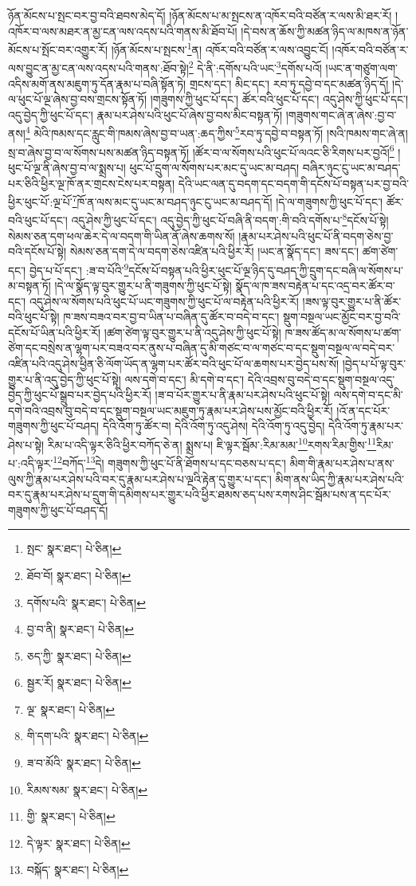 ཉོན་མོངས་པ་སྤང་བར་བྱ་བའི་ཐབས་མེད་དོ། །ཉོན་མོངས་པ་མ་སྤངས་ན་འཁོར་བའི་བཙོན་ར་ལས་མི་ཐར་རོ། །འཁོར་བ་ལས་མཐར་ན་མྱ་ངན་ལས་འདས་པའི་གནས་མི་ཐོབ་པོ། །དེ་བས་ན་ཆོས་ཀྱི་མཚན་ཉིད་ལ་མཁས་ན་ཉོན་མོངས་པ་སྤོང་བར་འགྱུར་རོ། །ཉོན་མོངས་པ་སྤངས་\footnote{སྤང་  སྣར་ཐང་།  པེ་ཅིན། }ན། འཁོར་བའི་བཙོན་ར་ལས་འབྱུང་ངོ། །འཁོར་བའི་བཙོན་ར་ལས་བྱུང་ན་མྱ་ངན་ལས་འདས་པའི་གནས་:ཐོབ་སྟེ།\footnote{ཐོབ་བོ།  སྣར་ཐང་།  པེ་ཅིན། } དེ་ནི་:དགོས་པའི་ཡང་\footnote{དགོས་པའི་  སྣར་ཐང་།  པེ་ཅིན། }དགོས་པའོ། །ཡང་ན་གཙུག་ལག་འདིས་མགོ་ནས་མཇུག་ཏུ་དོན་རྣམ་པ་བཞི་སྟོན་ཏེ། གྲངས་དང་། མིང་དང་། རབ་ཏུ་དབྱེ་བ་དང་མཚན་ཉིད་དོ། །དེ་ལ་ཕུང་པོ་ལྔ་ཞེས་བྱ་བས་གྲངས་སྟོན་ཏོ། །གཟུགས་ཀྱི་ཕུང་པོ་དང་། ཚོར་བའི་ཕུང་པོ་དང་། འདུ་ཤེས་ཀྱི་ཕུང་པོ་དང་། འདུ་བྱེད་ཀྱི་ཕུང་པོ་དང་། རྣམ་པར་ཤེས་པའི་ཕུང་པོ་ཞེས་བྱ་བས་མིང་བསྟན་ཏོ། །གཟུགས་གང་ཞེ་ན་ཞེས་:བྱ་བ་ནས།\footnote{བྱ་བ་ནི།  སྣར་ཐང་།  པེ་ཅིན། } མེའི་ཁམས་དང་རླུང་གི་ཁམས་ཞེས་བྱ་བ་ཡན་:ཆད་ཀྱིས་\footnote{ཅད་ཀྱི་  སྣར་ཐང་།  པེ་ཅིན། }རབ་ཏུ་དབྱེ་བ་བསྟན་ཏོ། །སའི་ཁམས་གང་ཞེ་ན། སྲ་བ་ཞེས་བྱ་བ་ལ་སོགས་པས་མཚན་ཉིད་བསྟན་ཏོ། །ཚོར་བ་ལ་སོགས་པའི་ཕུང་པོ་ལའང་ཅི་རིགས་པར་བྱའོ།\footnote{སྦྱར་རོ།  སྣར་ཐང་།  པེ་ཅིན། } །ཕུང་པོ་ལྔ་ནི་ཞེས་བྱ་བ་ལ་སྨྲས་པ། ཕུང་པོ་དྲུག་ལ་སོགས་པར་མང་དུ་ཡང་མ་བཤད། བཞིར་ཉུང་ངུ་ཡང་མ་བཤད་པར་ཅིའི་ཕྱིར་ལྔ་ཁོ་ནར་གྲངས་ངེས་པར་བསྟན། དེའི་ཡང་ལན་དུ་བདག་དང་བདག་གི་དངོས་པོ་བསྟན་པར་བྱ་བའི་ཕྱིར་ཕུང་པོ་:ལྔ་པོ་\footnote{ལྔ་  སྣར་ཐང་།  པེ་ཅིན། }ཁོ་ན་ལས་མང་དུ་ཡང་མ་བཤད་ཉུང་ངུ་ཡང་མ་བཤད་དོ། །དེ་ལ་གཟུགས་ཀྱི་ཕུང་པོ་དང་། ཚོར་བའི་ཕུང་པོ་དང་། འདུ་ཤེས་ཀྱི་ཕུང་པོ་དང་། འདུ་བྱེད་ཀྱི་ཕུང་པོ་བཞི་ནི་བདག་:གི་བའི་དགོས་པ་\footnote{གི་དག་པའི་  སྣར་ཐང་།  པེ་ཅིན། }དངོས་པོ་སྟེ། སེམས་ཅན་དག་ཕལ་ཆེར་དེ་ལ་བདག་གི་ཡིན་ནོ་ཞེས་ཆགས་སོ། །རྣམ་པར་ཤེས་པའི་ཕུང་པོ་ནི་བདག་ཅེས་བྱ་བའི་དངོས་པོ་སྟེ། སེམས་ཅན་དག་དེ་ལ་བདག་ཅེས་འཛིན་པའི་ཕྱིར་རོ། །ཡང་ན་སྣོད་དང་། ཟས་དང་། ཚག་ཙེག་དང་། བྱེད་པ་པོ་དང་། :ཟ་བ་པོའི་\footnote{ཟ་བ་མོའི་  སྣར་ཐང་།  པེ་ཅིན། }དངོས་པོ་བསྟན་པའི་ཕྱིར་ཕུང་པོ་ལྔ་ཉིད་དུ་བཤད་ཀྱི་དྲུག་དང་བཞི་ལ་སོགས་པ་མ་བསྟན་ཏོ། །དེ་ལ་སྣོད་ལྟ་བུར་གྱུར་པ་ནི་གཟུགས་ཀྱི་ཕུང་པོ་སྟེ། སྣོད་ལ་ཁ་ཟས་བརྟེན་པ་དང་འདྲ་བར་ཚོར་བ་དང་། འདུ་ཤེས་ལ་སོགས་པའི་ཕུང་པོ་ཡང་གཟུགས་ཀྱི་ཕུང་པོ་ལ་བརྟེན་པའི་ཕྱིར་རོ། །ཟས་ལྟ་བུར་གྱུར་པ་ནི་ཚོར་བའི་ཕུང་པོ་སྟེ། ཁ་ཟས་བཟའ་བར་བྱ་བ་ཡིན་པ་བཞིན་དུ་ཚོར་བ་བདེ་བ་དང་། སྡུག་བསྔལ་ཡང་མྱོང་བར་བྱ་བའི་དངོས་པོ་ཡིན་པའི་ཕྱིར་རོ། །ཚག་ཙེག་ལྟ་བུར་གྱུར་པ་ནི་འདུ་ཤེས་ཀྱི་ཕུང་པོ་སྟེ། ཁ་ཟས་ཚོད་མ་ལ་སོགས་པ་ཚག་ཙེག་དང་བསྲེས་ན་ལྷག་པར་བཟའ་བར་ནུས་པ་བཞིན་དུ་མི་གཙང་བ་ལ་གཙང་བ་དང་སྡུག་བསྔལ་ལ་བདེ་བར་འཛིན་པའི་འདུ་ཤེས་ཕྱིན་ཅི་ལོག་ཡོད་ན་ལྷག་པར་ཚོར་བའི་ཕུང་པོ་ལ་ཆགས་པར་བྱེད་པས་སོ། །བྱེད་པ་པོ་ལྟ་བུར་གྱུར་པ་ནི་འདུ་བྱེད་ཀྱི་ཕུང་པོ་སྟེ། ལས་དགེ་བ་དང་། མི་དགེ་བ་དང་། དེའི་འབྲས་བུ་བདེ་བ་དང་སྡུག་བསྔལ་འདུ་བྱེད་ཀྱི་ཕུང་པོ་སྒྲུབ་པར་བྱེད་པའི་ཕྱིར་རོ། །ཟ་བ་པོར་གྱུར་པ་ནི་རྣམ་པར་ཤེས་པའི་ཕུང་པོ་སྟེ། ལས་དགེ་བ་དང་མི་དགེ་བའི་འབྲས་བུ་བདེ་བ་དང་སྡུག་བསྔལ་ཡང་མཇུག་ཏུ་རྣམ་པར་ཤེས་པས་མྱོང་བའི་ཕྱིར་རོ། །འོ་ན་དང་པོར་གཟུགས་ཀྱི་ཕུང་པོ་བཤད། དེའི་འོག་ཏུ་ཚོར་བ། དེའི་འོག་ཏུ་འདུ་ཤེས། དེའི་འོག་ཏུ་འདུ་བྱེད། དེའི་འོག་ཏུ་རྣམ་པར་ཤེས་པ་སྟེ། རིམ་པ་འདི་ལྟར་ཅིའི་ཕྱིར་བཀོད་ཅེ་ན། སྨྲས་པ། ཇི་ལྟར་སྦོམ་:རིམ་མམ་\footnote{རིམས་སམ་  སྣར་ཐང་།  པེ་ཅིན། }རགས་རིམ་གྱིས་\footnote{གྱི་  སྣར་ཐང་།  པེ་ཅིན། }རིམ་པ་:འདི་ལྟར་\footnote{དེ་ལྟར་  སྣར་ཐང་།  པེ་ཅིན། }བཀོད་\footnote{བསྐོད་  སྣར་ཐང་།  པེ་ཅིན། }དེ། གཟུགས་ཀྱི་ཕུང་པོ་ནི་ཐོགས་པ་དང་བཅས་པ་དང་། མིག་གི་རྣམ་པར་ཤེས་པ་ནས་ལུས་ཀྱི་རྣམ་པར་ཤེས་པའི་བར་དུ་རྣམ་པར་ཤེས་པ་ལྔའི་རྟེན་དུ་གྱུར་པ་དང་། མིག་ནས་ཡིད་ཀྱི་རྣམ་པར་ཤེས་པའི་བར་དུ་རྣམ་པར་ཤེས་པ་དྲུག་གི་དམིགས་པར་གྱུར་པའི་ཕྱིར་ཐམས་ཅད་པས་རགས་ཤིང་སྦོམ་པས་ན་དང་པོར་གཟུགས་ཀྱི་ཕུང་པོ་བཤད་དོ། 